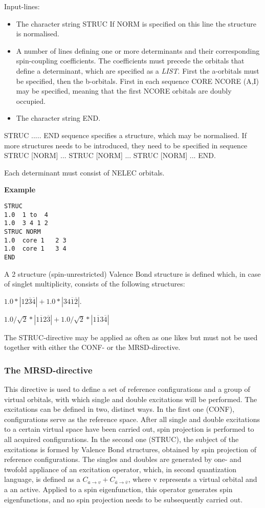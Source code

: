 \documentclass[11pt,fleqn]{article}
\begin{document}
Input-lines:
\begin{itemize}
\item The character string STRUC
If NORM is specified on this line the structure is normalised.
\item A number of lines defining one or more determinants and their 
corresponding spin-coupling coefficients. The coefficients must  precede 
the orbitals that define a determinant, which are specified as a  \textit{LIST}. 
First the a-orbitals must be specified, then the b-orbitals. 
First in each sequence  CORE NCORE (A,I)
may be specified, meaning that the first NCORE orbitals are doubly occupied.
\item The character string END.
\end{itemize}
STRUC ..... END sequence specifies  a structure, which may be normalised.
If more structures needs to be introduced, they need to be specified in sequence
STRUC [NORM] ... STRUC [NORM] ... STRUC [NORM] ... END.

Each determinant must consist of NELEC orbitals.

{\bf Example }
\begin{verbatim}
STRUC
1.0  1 to  4
1.0  3 4 1 2
STRUC NORM
1.0  core 1   2 3
1.0  core 1   3 4
END
\end{verbatim}

A 2 structure (spin-unrestricted) Valence Bond structure is defined which, in case of 
singlet multiplicity, consists of the following structures: 

$1.0*|12\overline{3}\overline{4}|+1.0*|34\overline{1}\overline{2}|$.

$1.0/\sqrt2 *|1\overline{1}2\overline{3}|+1.0/\sqrt2 *|1\overline{1}3\overline{4}|$


The STRUC-directive may be applied as often as one likes but must not be used together 
with either the CONF- or the MRSD-directive.

\subsubsection{The MRSD-directive}

This directive is used to define a set of reference configurations and a 
group of virtual orbitals, with which single and double excitations will 
be performed. The excitations can be defined in two, distinct ways. 
In the first one (CONF), configurations serve as the reference space. 
After all single and double excitations to a certain virtual space have been 
carried out, spin projection is performed to all acquired configurations. 
In the second one (STRUC), the subject of the excitations is formed by 
Valence Bond structures, obtained by spin projection of reference configurations. 
The singles and doubles are generated by one- and twofold appliance of an 
excitation operator, which, in second quantization language, is defined 
as a $C_{a \rightarrow v} + C_{\overline a \rightarrow \overline v}$, 
where v represents a virtual orbital and a an active. 
Applied to a spin eigenfunction, this operator generates spin eigenfunctions, 
and no spin projection needs to be subsequently carried out.
\end{document}
